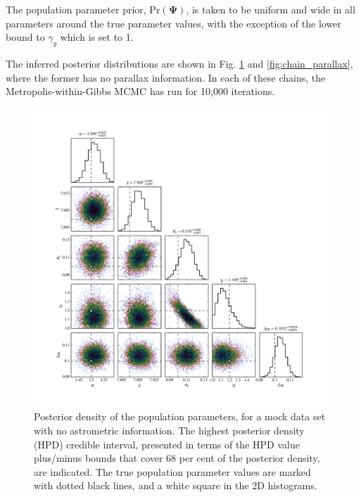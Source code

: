 \documentclass[fleqn,usenatbib]{mnras}
\newcommand{\popp}{\boldsymbol{\Psi}}
\newcommand{\pr}{\text{Pr}}
\begin{document}
The population parameter prior, $\pr(\popp)$, is taken to be uniform and wide in all parameters around the true parameter values, with the exception of the lower bound to $\gamma_g$ which is set to 1.

The inferred posterior distributions are shown in Fig. \ref{fig:chain} and \ref{fig:chain_parallax}, where the former has no parallax information. In each of these chains, the Metropolis-within-Gibbs MCMC has run for 10,000 iterations.

\begin{figure}
	\includegraphics[width=1.\textwidth]{toy_chain.pdf}
    \caption{ Posterior density of the population parameters, for a mock data set with no astrometric information. The highest posterior density (HPD) credible interval, presented in terms of the HPD value plus/minus bounds that cover 68 per cent of the posterior density, are indicated. The true population parameter values are marked with dotted black lines, and a white square in the 2D histograms.}
    \label{fig:chain}
\end{figure}
\end{document}
